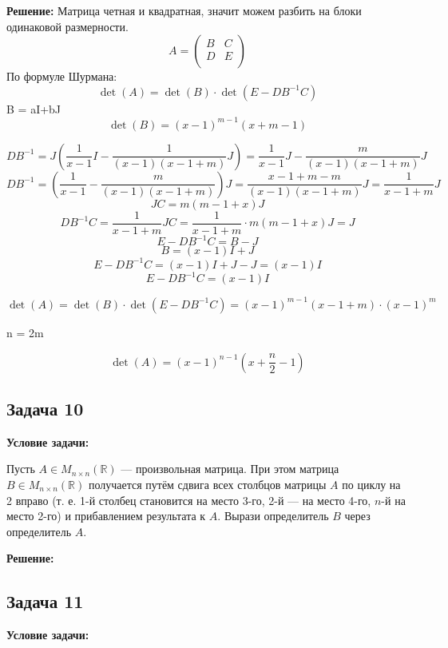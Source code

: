 \documentclass[a4paper,12pt]{article}
\begin{document}
\textbf{Решение:}
Матрица четная и квадратная, значит можем разбить на блоки одинаковой размерности.
\[
A = \begin{pmatrix}
B & C \\
D & E \\
\end{pmatrix}
\]
По формуле Шурмана: 
\[
\det(A) = \det(B) \cdot \det(E - D B^{-1} C)
\]
B = aI+bJ
\[
\det(B) = (x - 1)^{m - 1} (x + m - 1)
\]

\[
D B^{-1} = J \left( \frac{1}{x - 1} I - \frac{1}{(x - 1)(x - 1 +     m)} J \right) = \frac{1}{x - 1} J - \frac{m}{(x - 1)(x - 1 + m)} J
\]
\[
D B^{-1} = \left( \frac{1}{x - 1} - \frac{m}{(x - 1)(x - 1 + m)} \right) J = \frac{x - 1 + m - m}{(x - 1)(x - 1 + m)} J = \frac{1}{x - 1 + m} J
\]
\[
J C = m (m - 1 + x) J
\]
\[
D B^{-1} C = \frac{1}{x - 1 + m} J C = \frac{1}{x - 1 + m} \cdot m (m - 1 + x) J = J
\]
\[
E - D B^{-1} C = B - J
\]
\[
B = (x - 1)I + J
\]
\[
E - D B^{-1} C = (x - 1)I + J - J = (x - 1)I
\]
\[
E - D B^{-1} C = (x - 1)I
\]

\[
\det(A) = \det(B) \cdot \det(E - D B^{-1} C) = (x - 1)^{m - 1} (x - 1 + m) \cdot (x - 1)^m
\]

n = 2m

\[
\det(A) = (x - 1)^{n - 1} \left( x + \frac{n}{2} - 1 \right)
\]


\vspace{1cm}

\subsection{Задача 10}

\textbf{Условие задачи:}

Пусть \( A \in M_{n \times n}(\mathbb{R}) \) — произвольная матрица. При этом матрица \( B \in M_{n \times n}(\mathbb{R}) \) получается путём сдвига всех столбцов матрицы \( A \) по циклу на 2 вправо (т. е. 1-й столбец становится на место 3-го, 2-й — на место 4-го, \( n \)-й на место 2-го) и прибавлением результата к \( A \). Вырази определитель \( B \) через определитель \( A \).
 
\textbf{Решение:}

\vspace{1cm}

\subsection{Задача 11}

\textbf{Условие задачи:}
\end{document}
